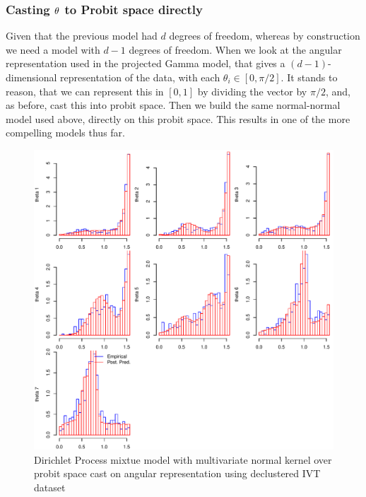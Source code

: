 \subsubsection{Casting ${\bf \theta}$ to Probit space directly}
\label{method:npprobitnorm2}

Given that the previous model had $d$ degrees of freedom, whereas by construction we need a model
  with $d-1$ degrees of freedom.  When we look at the angular representation used in the projected
  Gamma model, that gives a $(d-1)$-dimensional representation of the data, with each
  $\theta_i \in [0,\pi/2]$. It stands to reason, that we can represent this in $[0,1]$ by dividing
  the vector by $\pi/2$, and, as before, cast this into probit space.  Then we build the same
  normal-normal model used above, directly on this probit space.  This results in one of the more
  compelling models thus far.

\begin{figure}[h!]
  \label{fig:dpnormal2}
  \centering
  \caption{Dirichlet Process mixtue model with multivariate normal kernel over probit space cast
            on angular representation using declustered IVT dataset}
  \includegraphics[width=6in]{./images/dpmp2_emp_v_pred_decluster}
\end{figure}

